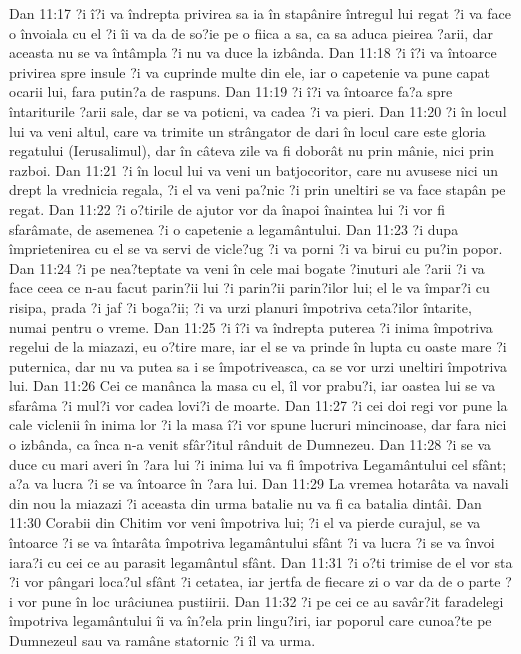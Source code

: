 Dan 11:17  ?i î?i va îndrepta privirea sa ia în stapânire întregul lui regat ?i va face o învoiala cu el ?i îi va da de so?ie pe o fiica a sa, ca sa aduca pieirea ?arii, dar aceasta nu se va întâmpla ?i nu va duce la izbânda.
Dan 11:18  ?i î?i va întoarce privirea spre insule ?i va cuprinde multe din ele, iar o capetenie va pune capat ocarii lui, fara putin?a de raspuns.
Dan 11:19  ?i î?i va întoarce fa?a spre întariturile ?arii sale, dar se va poticni, va cadea ?i va pieri.
Dan 11:20  ?i în locul lui va veni altul, care va trimite un strângator de dari în locul care este gloria regatului (Ierusalimul), dar în câteva zile va fi doborât nu prin mânie, nici prin razboi.
Dan 11:21  ?i în locul lui va veni un batjocoritor, care nu avusese nici un drept la vrednicia regala, ?i el va veni pa?nic ?i prin uneltiri se va face stapân pe regat.
Dan 11:22  ?i o?tirile de ajutor vor da înapoi înaintea lui ?i vor fi sfarâmate, de asemenea ?i o capetenie a legamântului.
Dan 11:23  ?i dupa împrietenirea cu el se va servi de vicle?ug ?i va porni ?i va birui cu pu?in popor.
Dan 11:24  ?i pe nea?teptate va veni în cele mai bogate ?inuturi ale ?arii ?i va face ceea ce n-au facut parin?ii lui ?i parin?ii parin?ilor lui; el le va împar?i cu risipa, prada ?i jaf ?i boga?ii; ?i va urzi planuri împotriva ceta?ilor întarite, numai pentru o vreme.
Dan 11:25  ?i î?i va îndrepta puterea ?i inima împotriva regelui de la miazazi, eu o?tire mare, iar el se va prinde în lupta cu oaste mare ?i puternica, dar nu va putea sa i se împotriveasca, ca se vor urzi uneltiri împotriva lui.
Dan 11:26  Cei ce manânca la masa cu el, îl vor prabu?i, iar oastea lui se va sfarâma ?i mul?i vor cadea lovi?i de moarte.
Dan 11:27  ?i cei doi regi vor pune la cale viclenii în inima lor ?i la masa î?i vor spune lucruri mincinoase, dar fara nici o izbânda, ca înca n-a venit sfâr?itul rânduit de Dumnezeu.
Dan 11:28  ?i se va duce cu mari averi în ?ara lui ?i inima lui va fi împotriva Legamântului cel sfânt; a?a va lucra ?i se va întoarce în ?ara lui.
Dan 11:29  La vremea hotarâta va navali din nou la miazazi ?i aceasta din urma batalie nu va fi ca batalia dintâi.
Dan 11:30  Corabii din Chitim vor veni împotriva lui; ?i el va pierde curajul, se va întoarce ?i se va întarâta împotriva legamântului sfânt ?i va lucra ?i se va învoi iara?i cu cei ce au parasit legamântul sfânt.
Dan 11:31  ?i o?ti trimise de el vor sta ?i vor pângari loca?ul sfânt ?i cetatea, iar jertfa de fiecare zi o var da de o parte ?i vor pune în loc urâciunea pustiirii.
Dan 11:32  ?i pe cei ce au savâr?it faradelegi împotriva legamântului îi va în?ela prin lingu?iri, iar poporul care cunoa?te pe Dumnezeul sau va ramâne statornic ?i îl va urma.
